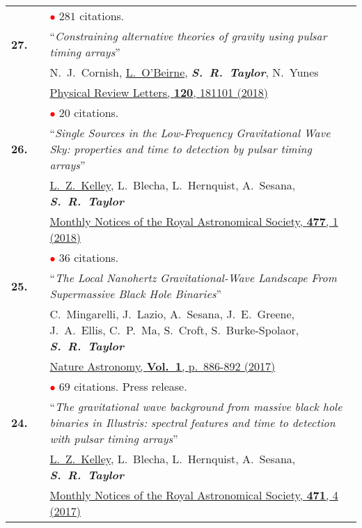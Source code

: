 \documentclass[11pt,letterpaper,sans]{moderncv}
\begin{document}
{\begin{longtable}{rp{0.3cm}p{15.8cm}}
&& \textcolor{red}{$\bullet$} $281$ citations. \vspace{0.09cm}\\
\textbf{27.} & & ``\textit{Constraining alternative theories of gravity using pulsar timing arrays}'' \\ 
&&N.~J.~Cornish, \underline{L.~O'Beirne}, \textit{\textbf{S.~R.~Taylor}}, N.~Yunes\\
&& \href{https://journals.aps.org/prl/abstract/10.1103/PhysRevLett.120.181101}{{\color{color1} Physical Review Letters, \textbf{120}, 181101 (2018)}}  \\
&& \textcolor{red}{$\bullet$} $20$ citations. \vspace{0.09cm}\\
\textbf{26.} & & ``\textit{Single Sources in the Low-Frequency Gravitational Wave Sky: properties and time to detection by pulsar timing arrays}'' \\ 
&&\underline{L.~Z.~Kelley}, L.~Blecha, L.~Hernquist, A.~Sesana, \textit{\textbf{S.~R.~Taylor}} \\
&& \href{https://academic.oup.com/mnras/article-abstract/477/1/964/4937809?redirectedFrom=fulltext}{{\color{color1} Monthly Notices of the Royal Astronomical Society, \textbf{477}, 1 (2018)}}  \\
&& \textcolor{red}{$\bullet$} $36$ citations. \vspace{0.09cm}\\
\textbf{25.} & & ``\textit{The Local Nanohertz Gravitational-Wave Landscape From Supermassive Black Hole Binaries}'' \\ 
&&C.~Mingarelli, J.~Lazio, A.~Sesana, J.~E.~Greene, J.~A.~Ellis, C.~P.~Ma, S.~Croft, S.~Burke-Spolaor, \textit{\textbf{S.~R.~Taylor}} \\
&& \href{https://www.nature.com/articles/s41550-017-0299-6}{{\color{color1} Nature Astronomy, \textbf{Vol.~1}, p.~886-892 (2017)}} \\
&& \textcolor{red}{$\bullet$} $69$ citations. Press release. \vspace{0.09cm}\\
\textbf{24.} & & ``\textit{The gravitational wave background from massive black hole binaries in Illustris: spectral features and time to detection with pulsar timing arrays}'' \\ 
&& \underline{L.~Z.~Kelley}, L.~Blecha, L.~Hernquist, A.~Sesana, \textit{\textbf{S.~R.~Taylor}} \\ 
&& \href{https://academic.oup.com/mnras/article/471/4/4508/3899130/The-gravitational-wave-background-from-massive}{{\color{color1} Monthly Notices of the Royal Astronomical Society, \textbf{471}, 4 (2017)}} \\

\end{longtable}}
\end{document}
